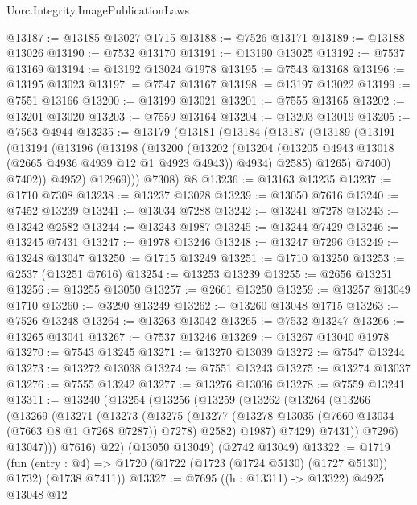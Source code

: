 \begin{lexlean}{Uorc.Integrity.ImagePublicationLaws}
\begin{coremodule}
@13187 := @13185 @13027 @1715
@13188 := @7526 @13171
@13189 := @13188 @13026
@13190 := @7532 @13170
@13191 := @13190 @13025
@13192 := @7537 @13169
@13194 := @13192 @13024 @1978
@13195 := @7543 @13168
@13196 := @13195 @13023
@13197 := @7547 @13167
@13198 := @13197 @13022
@13199 := @7551 @13166
@13200 := @13199 @13021
@13201 := @7555 @13165
@13202 := @13201 @13020
@13203 := @7559 @13164
@13204 := @13203 @13019
@13205 := @7563 @4944
@13235 := @13179
    (@13181
      (@13184
        (@13187
          (@13189
            (@13191
              (@13194
                (@13196
                  (@13198
                    (@13200
                      (@13202
                        (@13204 (@13205 @4943 @13018 (@2665 @4936 @4939 @12 @1 @4923 @4943)) @4934)
                        @2585)
                      @1265)
                    @7400)
                  @7402))
              @4952)
            @12969)))
      @7308)
    @8
@13236 := @13163 @13235
@13237 := @1710 @7308
@13238 := @13237 @13028
@13239 := @13050 @7616
@13240 := @7452 @13239
@13241 := @13034 @7288
@13242 := @13241 @7278
@13243 := @13242 @2582
@13244 := @13243 @1987
@13245 := @13244 @7429
@13246 := @13245 @7431
@13247 := @1978 @13246
@13248 := @13247 @7296
@13249 := @13248 @13047
@13250 := @1715 @13249
@13251 := @1710 @13250
@13253 := @2537 (@13251 @7616)
@13254 := @13253 @13239
@13255 := @2656 @13251
@13256 := @13255 @13050
@13257 := @2661 @13250
@13259 := @13257 @13049 @1710
@13260 := @3290 @13249
@13262 := @13260 @13048 @1715
@13263 := @7526 @13248
@13264 := @13263 @13042
@13265 := @7532 @13247
@13266 := @13265 @13041
@13267 := @7537 @13246
@13269 := @13267 @13040 @1978
@13270 := @7543 @13245
@13271 := @13270 @13039
@13272 := @7547 @13244
@13273 := @13272 @13038
@13274 := @7551 @13243
@13275 := @13274 @13037
@13276 := @7555 @13242
@13277 := @13276 @13036
@13278 := @7559 @13241
@13311 := @13240
    (@13254
      (@13256
        (@13259
          (@13262
            (@13264
              (@13266
                (@13269
                  (@13271
                    (@13273
                      (@13275
                        (@13277
                          (@13278 @13035 (@7660 @13034 (@7663 @8 @1 @7268 @7287)) @7278)
                          @2582)
                        @1987)
                      @7429)
                    @7431))
                @7296)
              @13047)))
        @7616)
      @22)
    (@13050 @13049)
    (@2742 @13049)
@13322 := @1719
    (fun (entry : @4) => @1720 (@1722 (@1723 (@1724 @5130) (@1727 @5130)) @1732) (@1738 @7411))
@13327 := @7695 ((h : @13311) -> @13322) @4925 @13048 @12

\end{coremodule}
\end{lexlean}
